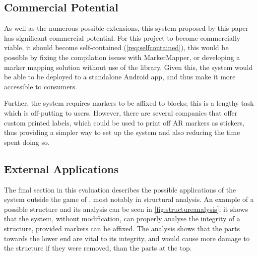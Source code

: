 \subsection{Commercial Potential}

As well as the numerous possible extensions, this system proposed by this paper has significant commercial potential. For this project to become commercially viable, it should become self-contained (\cref{req:selfcontained}), this would be possible by fixing the compilation issues with MarkerMapper, or developing a marker mapping solution without use of the library. Given this, the system would be able to be deployed to a standalone Android app, and thus make it more accessible to consumers.

Further, the system requires markers to be affixed to blocks; this is a lengthy task which is off-putting to users. However, there are several companies that offer custom printed labels, which could be used to print off AR markers as stickers, thus providing a simpler way to set up the system and also reducing the time spent doing so.

\subsection{External Applications}

The final section in this evaluation describes the possible applications of the system outside the game of \jenga{}, most notably in structural analysis. An example of a possible structure and its analysis can be seen in \cref{fig:structureanalysis}; it shows that the system, without modification, can properly analyse the integrity of a structure, provided markers can be affixed. The analysis shows that the parts towards the lower end are vital to its integrity, and would cause more damage to the structure if they were removed, than the parts at the top.


